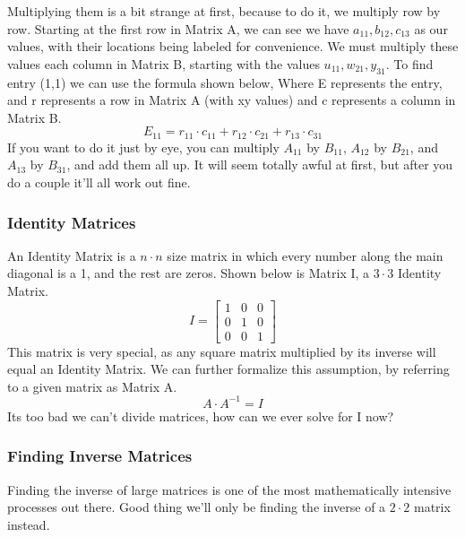 \documentclass[final,1p,12pt]{elsarticle}
\begin{document}
        Multiplying them is a bit strange at first, because to do it, we multiply row by row. Starting at the first row in Matrix A, we can see we have $a_{11},b_{12},c_{13}$ as our values, with their locations being labeled for convenience.  We must multiply these values each column in Matrix B, starting with the values $u_{11},w_{21},y_{31}$. To find entry (1,1) we can use the formula shown below, Where E represents the entry, and r represents a row in Matrix A (with xy values) and c represents a column in Matrix B.
        \begin{equation*}
            E_{11} = r_{11} \cdot c_{11}  +  r_{12} \cdot c_{21}  +   r_{13} \cdot c_{31}
        \end{equation*}
        If you want to do it just by eye, you can multiply $A_{11}$ by $B_{11}$, $A_{12}$ by $B_{21}$, and $A_{13}$ by $B_{31}$, and add them all up. It will seem totally awful at first, but after you do a couple it'll all work out fine.
        
        \subsubsection{Identity Matrices}
        An Identity Matrix is a $n\cdot n$ size matrix in which every number along the main diagonal is a 1, and the rest are zeros. Shown below is Matrix I, a $3\cdot 3$ Identity Matrix.
        \begin{equation*}
        I =
            \begin{bmatrix}
                1 & 0 & 0\\
                0 & 1 & 0\\
                0 & 0 & 1
            \end{bmatrix}
        \end{equation*}
        This matrix is very special, as any square matrix multiplied by its inverse will equal an Identity Matrix. We can further formalize this assumption, by referring to a given matrix as Matrix A.
        \begin{equation*}
            A\cdot A^{-1} = I
        \end{equation*}
        Its too bad we can't divide matrices, how can we ever solve for I now?
        
        \subsubsection{Finding Inverse Matrices}
        Finding the inverse of large matrices is one of the most mathematically intensive processes out there. Good thing we'll only be finding the inverse of a $2\cdot2$ matrix instead.
    
    
\clearpage\appendix

\end{document}
